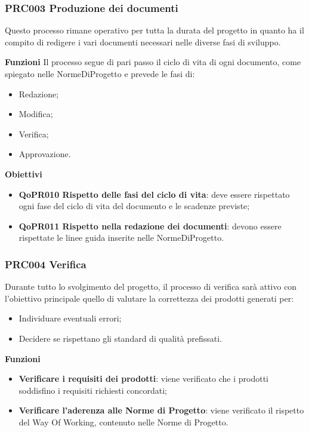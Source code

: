 \documentclass[../paino-di-qualifica.tex]{subfiles}
\begin{document}
\subsubsection{PRC003 Produzione dei documenti}
\label{sub:produzione_dei_documenti}
Questo processo rimane operativo per tutta la durata del progetto in quanto ha il compito di redigere i vari documenti necessari nelle diverse fasi di sviluppo.

\textbf{Funzioni}
Il processo segue di pari passo il ciclo di vita di ogni documento, come spiegato nelle NormeDiProgetto e prevede le fasi di:
\begin{itemize}
    \item Redazione;
    \item Modifica;
    \item Verifica;
    \item Approvazione.        
\end{itemize}

\textbf{Obiettivi}
\begin{itemize}
    \item \textbf{QoPR010 Rispetto delle fasi del ciclo di vita}: deve essere rispettato ogni fase del ciclo di vita del documento e le scadenze previste;
    \item \textbf{QoPR011 Rispetto nella redazione dei documenti}: devono essere rispettate le linee guida inserite nelle NormeDiProgetto.
\end{itemize}

\subsubsection{PRC004 Verifica}
\label{sub:produzione_dei_documenti}
Durante tutto lo svolgimento del progetto, il processo di verifica sarà attivo con l'obiettivo principale quello di valutare la correttezza dei prodotti generati per: 
\begin{itemize}
    \item Individuare eventuali errori;
    \item Decidere se rispettano gli standard di qualità prefissati.
\end{itemize}

\textbf{Funzioni}
\begin{itemize}
    \item \textbf{Verificare i requisiti dei prodotti}: viene verificato che i prodotti soddisfino i requisiti richiesti concordati;
    \item \textbf{Verificare l'aderenza alle Norme di Progetto}: viene verificato il rispetto del Way Of Working, contenuto nelle Norme di Progetto.
\end{itemize}
\end{document}
